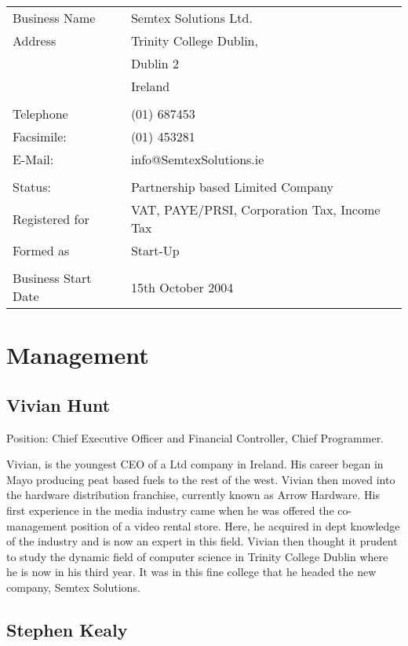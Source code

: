 \documentclass[a4paper,12pt]{article}
\begin{document}
\begin{tabular}{ll}
Business Name	& 	Semtex Solutions Ltd.	\\
Address			&	Trinity College Dublin, \\
					&	Dublin	2					\\
					&	Ireland						\\
					&									\\					
Telephone 		&	(01) 687453					\\
Facsimile: 		&	(01) 453281					\\
E-Mail:			&	info@SemtexSolutions.ie \\
					&									\\					
Status:			&	Partnership based Limited Company \\
Registered for &	VAT, PAYE/PRSI, Corporation Tax, Income Tax \\
Formed as		&	Start-Up						\\
					&									\\					
Business Start Date	& 	15th October 2004	\\
\end{tabular}

\section{Management}

\subsection{Vivian Hunt}

Position: Chief Executive Officer and Financial Controller, Chief
Programmer.


Vivian, is the youngest CEO of a Ltd company in Ireland. His career
began in Mayo producing peat based fuels to the rest of the west. Vivian
then moved into the hardware distribution franchise, currently known as
Arrow Hardware. His first experience in the media industry came when he
was offered the co-management position of a video rental store. Here, he
acquired in dept knowledge of the industry and is now an expert in this
field. Vivian then thought it prudent to study the dynamic field of
computer science in Trinity College Dublin where he is now in his third
year. It was in this fine college that he headed the new company, Semtex
Solutions.

\subsection{Stephen Kealy}
\end{document}
